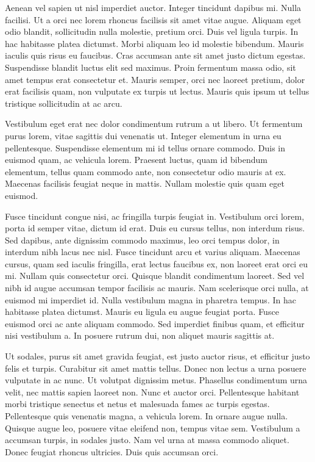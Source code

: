Aenean vel sapien ut nisl imperdiet auctor. Integer tincidunt dapibus mi. Nulla facilisi. Ut a orci nec lorem rhoncus facilisis sit amet vitae augue. Aliquam eget odio blandit, sollicitudin nulla molestie, pretium orci. Duis vel ligula turpis. In hac habitasse platea dictumst. Morbi aliquam leo id molestie bibendum. Mauris iaculis quis risus eu faucibus. Cras accumsan ante sit amet justo dictum egestas. Suspendisse blandit luctus elit sed maximus. Proin fermentum massa odio, sit amet tempus erat consectetur et. Mauris semper, orci nec laoreet pretium, dolor erat facilisis quam, non vulputate ex turpis ut lectus. Mauris quis ipsum ut tellus tristique sollicitudin at ac arcu.

Vestibulum eget erat nec dolor condimentum rutrum a ut libero. Ut fermentum purus lorem, vitae sagittis dui venenatis ut. Integer elementum in urna eu pellentesque. Suspendisse elementum mi id tellus ornare commodo. Duis in euismod quam, ac vehicula lorem. Praesent luctus, quam id bibendum elementum, tellus quam commodo ante, non consectetur odio mauris at ex. Maecenas facilisis feugiat neque in mattis. Nullam molestie quis quam eget euismod.

Fusce tincidunt congue nisi, ac fringilla turpis feugiat in. Vestibulum orci lorem, porta id semper vitae, dictum id erat. Duis eu cursus tellus, non interdum risus. Sed dapibus, ante dignissim commodo maximus, leo orci tempus dolor, in interdum nibh lacus nec nisl. Fusce tincidunt arcu et varius aliquam. Maecenas cursus, quam sed iaculis fringilla, erat lectus faucibus ex, non laoreet erat orci eu mi. Nullam quis consectetur orci. Quisque blandit condimentum laoreet. Sed vel nibh id augue accumsan tempor facilisis ac mauris. Nam scelerisque orci nulla, at euismod mi imperdiet id. Nulla vestibulum magna in pharetra tempus. In hac habitasse platea dictumst. Mauris eu ligula eu augue feugiat porta. Fusce euismod orci ac ante aliquam commodo. Sed imperdiet finibus quam, et efficitur nisi vestibulum a. In posuere rutrum dui, non aliquet mauris sagittis at.

Ut sodales, purus sit amet gravida feugiat, est justo auctor risus, et efficitur justo felis et turpis. Curabitur sit amet mattis tellus. Donec non lectus a urna posuere vulputate in ac nunc. Ut volutpat dignissim metus. Phasellus condimentum urna velit, nec mattis sapien laoreet non. Nunc et auctor orci. Pellentesque habitant morbi tristique senectus et netus et malesuada fames ac turpis egestas. Pellentesque quis venenatis magna, a vehicula lorem. In ornare augue nulla. Quisque augue leo, posuere vitae eleifend non, tempus vitae sem. Vestibulum a accumsan turpis, in sodales justo. Nam vel urna at massa commodo aliquet. Donec feugiat rhoncus ultricies. Duis quis accumsan orci.

